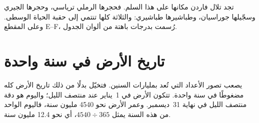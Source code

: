 تجد تلال فاردن مكانها على هذا السلم. فحجرها الرملي ترياسي، وحجرها الجيري
وسجّيلها جوراسيان، وطباشيرها طباشيري: والثلاثة كلها تنتمي إلى حقبة الحياة
الوسطى. وعلى المقطع E--F، رُسمت بدرجات باهتة من ألوان الجدول.

\section{تاريخ الأرض في سنة واحدة}

يصعب تصور الأعداد التي تُعد بمليارات السنين. فتخيّل بدلًا من ذلك تاريخ الأرض
كله مضغوطًا في سنة واحدة. تتكون الأرض في 1~يناير عند منتصف الليل؛ واليوم
هو دقة منتصف الليل في نهاية 31~ديسمبر. وعمر الأرض نحو \num{4540} مليون
سنة، فاليوم الواحد من هذه السنة يمثل $4540 \div 365$، أي نحو \num{12.4}
مليون سنة.


